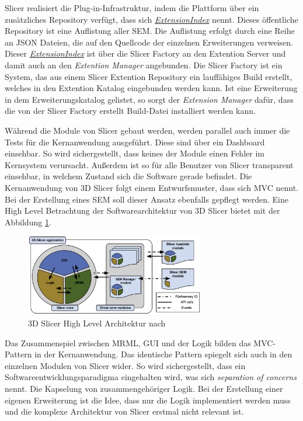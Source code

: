 Slicer realisiert die Plug-in-Infrastruktur, indem die Plattform über ein
zusätzliches Repository verfügt, dass sich \href{https://github.com/Slicer/ExtensionsIndex?tab=readme-ov-file}{\textit{ExtensionIndex}}
nennt. Dieses öffentliche Repository ist eine Auflistung aller \ac{SEM}. Die
Auflistung erfolgt durch eine Reihe an \ac{JSON} Dateien, die auf den Quellcode
der einzelnen Erweiterungen verweisen. Dieser \href{https://github.com/Slicer/ExtensionsIndex?tab=readme-ov-file}{\textit{ExtensionIndex}}
ist über die Slicer Factory an den Extention Server und damit auch an den \textit{Extention
Manager} angebunden. Die Slicer Factory ist ein System, das aus einem Slicer
Extention Repository ein lauffähiges Build erstellt, welches in den Extention Katalog
eingebunden werden kann. Ist eine Erweiterung in dem Erweiterungskatalog
gelistet, so sorgt der \textit{Extension Manager} dafür, dass die von der Slicer
Factory erstellt Build-Datei installiert werden kann.

Während die Module von Slicer gebaut werden, werden parallel auch immer die
Tests für die Kernanwendung ausgeführt. Diese sind über ein Dashboard einsehbar.
So wird sichergestellt, dass keines der Module einen Fehler im Kernsystem verursacht.
Außerdem ist so für alle Benutzer von Slicer transparent einsehbar, in welchem Zustand
sich die Software gerade befindet. Die Kernanwendung von 3D Slicer folgt einem
Entwurfsmuster, dass sich \ac{MVC} nennt. Bei der Erstellung eines \ac{SEM} soll
dieser Ansatz ebenfalls gepflegt werden. Eine High Level Betrachtung der Softwarearchitektur
von 3D Slicer bietet \cite[S.~1332]{fedorov2012slicer} mit der Abbildung \ref{fig:3d_slicer_architektur}.

\begin{figure}[h]
	\centering
	\includegraphics[width=0.7\textwidth]{img/3d_slicer_architektur.jpg}
	\caption{3D Slicer High Level Architektur nach \citet[S.~1332]{fedorov2012slicer}}
	\label{fig:3d_slicer_architektur}
\end{figure}

Das Zusammenspiel zwischen \ac{MRML}, \ac{GUI} und der Logik bilden das MVC-Pattern
in der Kernanwendung. Das identische Pattern spiegelt sich auch in den einzelnen
Modulen von Slicer wider. So wird sichergestellt, dass ein
Softwareentwicklungsparadigma eingehalten wird, was sich \textit{separation of
concerns} nennt. Die Kapselung von zusammengehöriger Logik. Bei der Erstellung
einer eigenen Erweiterung ist die Idee, dass nur die Logik implementiert werden muss
und die komplexe Architektur von Slicer erstmal nicht relevant ist.

